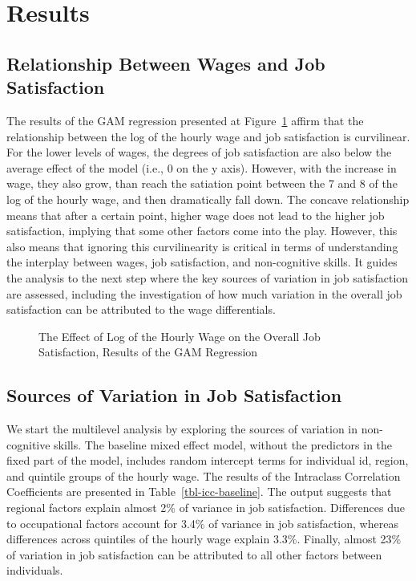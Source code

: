 \documentclass[
]{interact}
\begin{document}
\section{Results}\label{results}

\subsection{Relationship Between Wages and Job
Satisfaction}\label{relationship-between-wages-and-job-satisfaction}

The results of the GAM regression presented at
Figure~\ref{fig-wage-jobsatisf} affirm that the relationship between the
log of the hourly wage and job satisfaction is curvilinear. For the
lower levels of wages, the degrees of job satisfaction are also below
the average effect of the model (i.e., 0 on the y axis). However, with
the increase in wage, they also grow, than reach the satiation point
between the 7 and 8 of the log of the hourly wage, and then dramatically
fall down. The concave relationship means that after a certain point,
higher wage does not lead to the higher job satisfaction, implying that
some other factors come into the play. However, this also means that
ignoring this curvilinearity is critical in terms of understanding the
interplay between wages, job satisfaction, and non-cognitive skills. It
guides the analysis to the next step where the key sources of variation
in job satisfaction are assessed, including the investigation of how
much variation in the overall job satisfaction can be attributed to the
wage differentials.

\begin{figure}


\caption{\label{fig-wage-jobsatisf}The Effect of Log of the Hourly Wage
on the Overall Job Satisfaction, Results of the GAM Regression}

\end{figure}%

\subsection{Sources of Variation in Job
Satisfaction}\label{sources-of-variation-in-job-satisfaction}

We start the multilevel analysis by exploring the sources of variation
in non-cognitive skills. The baseline mixed effect model, without the
predictors in the fixed part of the model, includes random intercept
terms for individual id, region, and quintile groups of the hourly wage.
The results of the Intraclass Correlation Coefficients are presented in
Table~\ref{tbl-icc-baseline}. The output suggests that regional factors
explain almost 2\% of variance in job satisfaction. Differences due to
occupational factors account for 3.4\% of variance in job satisfaction,
whereas differences across quintiles of the hourly wage explain 3.3\%.
Finally, almost 23\% of variation in job satisfaction can be attributed
to all other factors between individuals.
\end{document}
